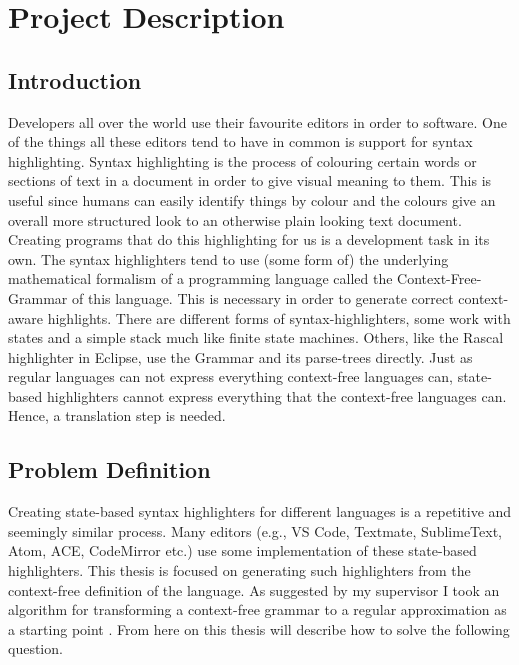 
\chapter{Project Description} %

\label{problemdescription} %


\section{Introduction}
Developers all over the world use their favourite editors in order to  software. One of the things all these editors tend to have in common is support for syntax highlighting. Syntax highlighting is the process of colouring certain words or sections of text in a document in order to give visual meaning to them. This is useful since humans can easily identify things by colour and the colours give an overall more structured look to an otherwise plain looking text document. Creating programs that do this highlighting for us is a development task in its own. The syntax highlighters tend to use (some form of) the underlying mathematical formalism of a programming language called the Context-Free-Grammar of this language. This is necessary in order to generate correct context-aware highlights. There are different forms of syntax-highlighters, some work with states and a simple stack much like finite state machines. Others, like the Rascal highlighter in Eclipse, use the Grammar and its parse-trees directly. Just as regular languages can not express everything context-free languages can, state-based highlighters cannot express everything that the context-free languages can. Hence, a translation step is needed.

\pagebreak

\section{Problem Definition}
Creating state-based syntax highlighters for different languages is a repetitive and seemingly similar process. Many editors (e.g., VS Code, Textmate, SublimeText, Atom, ACE, CodeMirror etc.) use some implementation of these state-based highlighters. This thesis is focused on generating such highlighters from the context-free definition of the language. As suggested by my supervisor I took an algorithm for transforming a context-free grammar to a regular approximation as a starting point \parencite{MohriNederhof}. From here on this thesis will describe how to solve the following question. 

